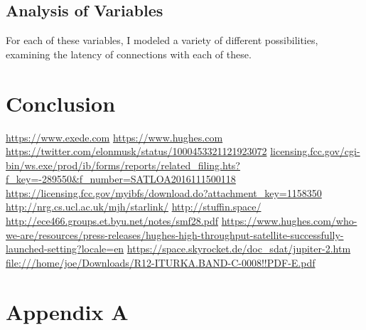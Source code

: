 \documentclass[12pt]{article}
\begin{document}
\subsection{Analysis of Variables}
For each of these variables, I modeled a variety of different possibilities, examining the latency of connections with each of these.


\section{Conclusion}


\begin{thebibliography}{99}
	 \url{https://www.exede.com}
	 \url{https://www.hughes.com}
	 \url{https://twitter.com/elonmusk/status/1000453321121923072}
	 \url{licensing.fcc.gov/cgi-bin/ws.exe/prod/ib/forms/reports/related_filing.hts?f_key=-289550&f_number=SATLOA2016111500118}
	 \url{https://licensing.fcc.gov/myibfs/download.do?attachment_key=1158350}
	 \url{http://nrg.cs.ucl.ac.uk/mjh/starlink/}
	 \url{http://stuffin.space/}
	 \url{http://ece466.groups.et.byu.net/notes/smf28.pdf}
	 \url{https://www.hughes.com/who-we-are/resources/press-releases/hughes-high-throughput-satellite-successfully-launched-setting?locale=en}
	 \url{https://space.skyrocket.de/doc_sdat/jupiter-2.htm}
	 \url{file:///home/joe/Downloads/R12-ITURKA.BAND-C-0008!!PDF-E.pdf}
\end{thebibliography}
\appendix

\section{Appendix A}

\printindex

\end{document}
